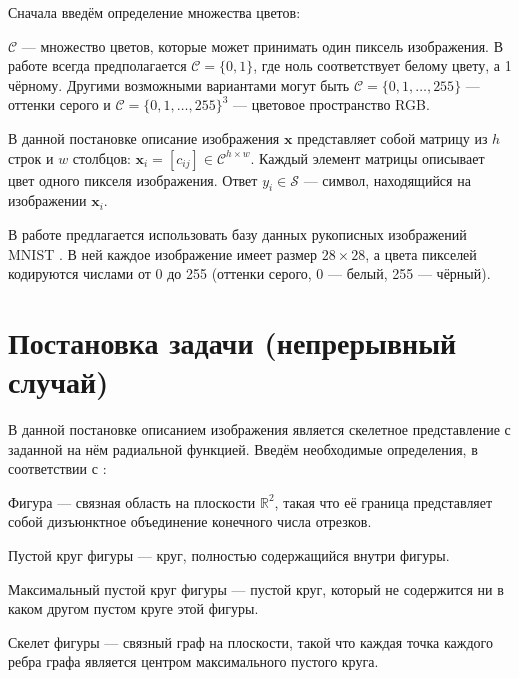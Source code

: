 \documentclass[12pt,twoside]{article}
\newcommand{\x}{\mathbf{x}}
\begin{document}
	Сначала введём определение множества цветов:
	
	\begin{Def}
		$\mathcal{C}$ --- множество цветов, которые может принимать один пиксель изображения. В работе всегда предполагается $\mathcal{C}=\{0,1\}$, где ноль соответствует белому цвету, а 1 чёрному. Другими возможными вариантами могут быть $\mathcal{C}=\{0,1,\ldots,255\}$ --- оттенки серого и $\mathcal{C}=\{0,1,\ldots,255\}^3$ --- цветовое пространство RGB.
	\end{Def}
	
	В данной постановке описание изображения $\x$ представляет собой матрицу из $h$ строк и $w$ столбцов: $\x_i = [c_{ij}] \in \mathcal{C}^{h\times w}$. Каждый элемент матрицы описывает цвет одного пикселя изображения. Ответ $y_i \in \mathcal{S}$ --- символ, находящийся на изображении $\x_i$.
	
	В работе предлагается использовать базу данных рукописных изображений MNIST \cite{mnist}. В ней каждое изображение имеет размер $28\times28$, а цвета пикселей кодируются числами от 0 до 255 (оттенки серого, 0 --- белый, 255 --- чёрный).
	
	\section{Постановка задачи (непрерывный случай)}
	
	В данной постановке описанием изображения является скелетное представление с заданной на нём радиальной функцией. Введём необходимые определения, в соответствии с \cite{mest2009}:
	
	\begin{Def}
		Фигура --- связная область на плоскости $\mathbb{R}^2$, такая что её граница представляет собой дизъюнктное объединение конечного числа отрезков.
	\end{Def}
	
	\begin{Def}
		Пустой круг фигуры --- круг, полностью содержащийся внутри фигуры.
	\end{Def}
	
	\begin{Def}
		Максимальный пустой круг фигуры --- пустой круг, который не содержится ни в каком другом пустом круге этой фигуры.
	\end{Def}
	
	\begin{Def}
		Скелет фигуры --- связный граф на плоскости, такой что каждая точка каждого ребра графа является центром максимального пустого круга.
	\end{Def}
	
\end{document}
